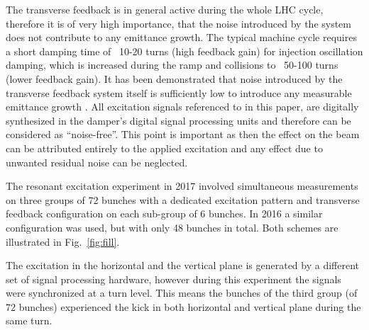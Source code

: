 \documentclass[%
 reprint,
 amsmath,amssymb,
 aps,
prstab,
]{revtex4-1}
\begin{document}
The transverse feedback is in general active during the whole LHC cycle, therefore it is of very high importance, that the noise introduced by the system does not contribute to any emittance growth. The typical machine cycle requires a short damping time of ~10-20 turns (high feedback gain) for injection oscillation damping, which is increased during the ramp and collisions to ~50-100 turns (lower feedback gain). It has been demonstrated that noise introduced by the transverse feedback system itself is sufficiently low to introduce any measurable emittance growth \cite{adt_noise_emit_2017}. All excitation signals referenced to in this paper, are digitally synthesized in the damper's digital signal processing units and therefore can be considered as ``noise-free''. This point is important as then the effect on the beam can be attributed entirely to the applied excitation and any effect due to unwanted residual noise can be neglected.

The resonant excitation experiment in 2017 involved simultaneous measurements on three groups of 72 bunches with a dedicated excitation pattern and transverse feedback configuration on each sub-group of 6 bunches. In 2016 a similar configuration was used, but with only 48 bunches in total. Both schemes are illustrated in Fig.~\ref{fig:fill}.

The excitation in the horizontal and the vertical plane is generated by a different set of signal processing hardware, however during this experiment the signals were synchronized at a turn level. This means the bunches of the third group (of 72 bunches) experienced the kick in both horizontal and vertical plane during the same turn.
\end{document}
